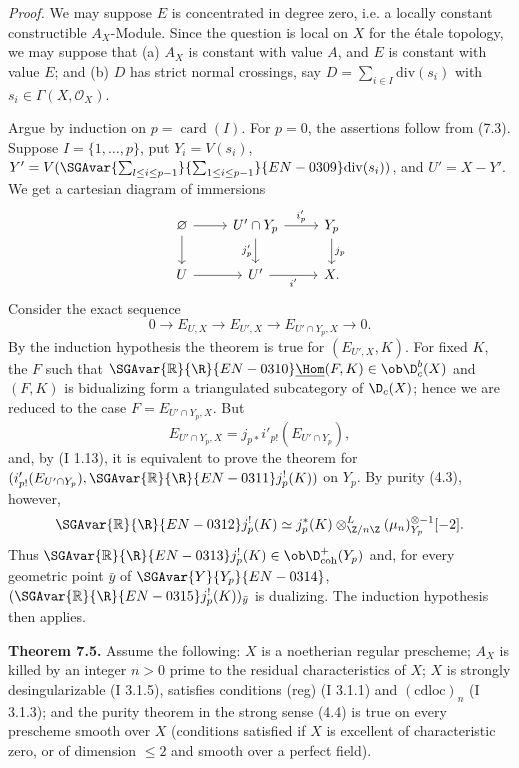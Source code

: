 \emph{Proof.} We may suppose $E$ is concentrated in degree zero, i.e. a locally constant constructible $A_X$-Module. Since the question is local on $X$ for the étale topology, we may suppose that (a) $A_X$ is constant with value $A$, and $E$ is constant with value $E$; and (b) $D$ has strict normal crossings, say $D=\sum_{i\in I}\mathrm{div}(s_i)$ with $s_i\in\Gamma(X,\mathcal{O}_X)$.

Argue by induction on $p=\operatorname{card}(I)$. For $p=0$, the assertions follow from (7.3). Suppose $I=\{1,\ldots,p\}$, put $Y_i=V(s_i)$, $Y'=V(\SGAvar{\sum_{l\leq i\leq p-1}}{\sum_{1\leq i\leq p-1}}{EN-0309}\mathrm{div}(s_i))$, and $U'=X-Y'$. We get a cartesian diagram of immersions
\[
\begin{tikzcd}
\varnothing \arrow[r] \arrow[d] & U'\cap Y_p \arrow[r,"i'_p"] \arrow[d,"j'_p"'] & Y_p \arrow[d,"j_p"]\\
U \arrow[r] & U' \arrow[r,"i'"'] & X.
\end{tikzcd}
\]
Consider the exact sequence
\[
        0\longrightarrow E_{U,X}\longrightarrow E_{U',X}\longrightarrow E_{U'\cap Y_p,X}\longrightarrow0.
\]
By the induction hypothesis the theorem is true for $(E_{U',X},K)$. For fixed $K$, the $F$ such that $\SGAvar{\mathbb{R}}{\R}{EN-0310}\underline{\Hom}(F,K)\in\ob\D_c^b(X)$ and $(F,K)$ is bidualizing form a triangulated subcategory of $\D_c(X)$; hence we are reduced to the case $F=E_{U'\cap Y_p,X}$. But
\[
        E_{U'\cap Y_p,X}=j_{p*}i'_{p!}(E_{U'\cap Y_p}),
\]
and, by (I 1.13), it is equivalent to prove the theorem for $(i'_{p!}(E_{U'\cap Y_p}),\SGAvar{\mathbb{R}}{\R}{EN-0311} j_p^!(K))$ on $Y_p$. By purity (4.3), however,
\[
        \SGAvar{\mathbb{R}}{\R}{EN-0312} j_p^!(K)\simeq j_p^*(K)\otimes^L_{\Z/n\Z}(\mu_n)_{Y_p}^{\otimes -1}[-2].
\]
Thus $\SGAvar{\mathbb{R}}{\R}{EN-0313} j_p^!(K)\in\ob\D^{+}_{\mathrm{coh}}(Y_p)$ and, for every geometric point $\bar{y}$ of $\SGAvar{Y}{Y_p}{EN-0314}$, $(\SGAvar{\mathbb{R}}{\R}{EN-0315} j_p^!(K))_{\bar{y}}$ is dualizing. The induction hypothesis then applies.

\textbf{Theorem 7.5.} Assume the following: $X$ is a noetherian regular prescheme; $A_X$ is killed by an integer $n>0$ prime to the residual characteristics of $X$; $X$ is strongly desingularizable (I 3.1.5), satisfies conditions (reg) (I 3.1.1) and $(\mathrm{cdloc})_n$ (I 3.1.3); and the purity theorem in the strong sense (4.4) is true on every prescheme smooth over $X$ (conditions satisfied if $X$ is excellent of characteristic zero, or of dimension $\leq2$ and smooth over a perfect field).

